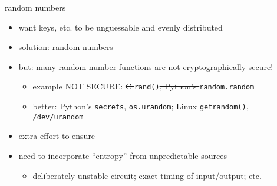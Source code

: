 \begin{frame}{random numbers}
    \begin{itemize}
    \item want keys, etc. to be unguessable and evenly distributed
    \vspace{.5cm}
    \item solution: random numbers
    \item but: many random number functions are not cryptographically secure!
        \begin{itemize}
        \item example NOT SECURE: \sout{C \texttt{rand()}; Python's \texttt{random.random}}
        \item better: Python's \texttt{secrets}, \texttt{os.urandom}; Linux \texttt{getrandom()}, \texttt{/dev/urandom}
        \end{itemize}
    \vspace{.5cm}
    \item extra effort to ensure 
    \item need to incorporate ``entropy'' from unpredictable sources
        \begin{itemize}
        \item deliberately unstable circuit; exact timing of input/output; etc.
        \end{itemize}
    \end{itemize}
\end{frame}
